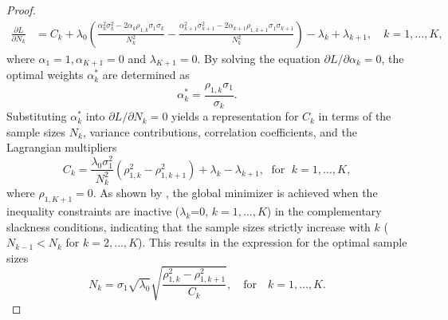 \begin{proof}
\begin{align*}
    \frac{\partial L}{\partial N_k}&=C_k+\lambda_0\left(\frac{\alpha_k^2\sigma_k^2 - 2\alpha_k\rho_{1,k}\sigma_1\sigma_k}{N_k^2}-\frac{\alpha_{k+1}^2\sigma_{k+1}^2 - 2\alpha_{k+1}\rho_{1,k+1}\sigma_1\sigma_{k+1}}{N_k^2}\right)-\lambda_k+\lambda_{k+1}, \quad k=1,\dots,K,
\end{align*}
%
where $\alpha_1 = 1, \alpha_{K+1} = 0$ and $\lambda_{K+1} = 0$. By solving the equation $\partial L/\partial \alpha_k=0$, the optimal weights $\alpha_k^*$ are determined as
%
\[
\alpha_k^*=\frac{\rho_{1,k}\sigma_1}{\sigma_k}.
\]
%
Substituting $\alpha_k^*$ into $\partial L/\partial N_k=0$ yields a representation for $C_k$ in terms of the sample sizes $N_k$, variance contributions, correlation coefficients, and the Lagrangian multipliers
\begin{equation*}
    C_k=\frac{\lambda_0\sigma_1^2}{N_k^2}\left(\rho_{1,k}^2-\rho_{1,k+1}^2\right)+\lambda_k-\lambda_{k+1}, \;\text{ for }\; k=1,\ldots,K, 
\end{equation*}
where $\rho_{1,K+1} = 0$. As shown by  \cite{PeWiGu:2016}, the global minimizer is achieved when the inequality constraints are inactive ($\lambda_k$=0, $k=1,\dots, K$) in the complementary slackness conditions, indicating that the sample sizes strictly increase with $k$ ($N_{k-1}< N_k$ for $k=2,\ldots, K$). This results in the expression for the optimal sample sizes
\begin{equation}
\label{eq:sample_size_1}
    N_k = \sigma_1\sqrt{\lambda_0}\sqrt{\frac{\rho_{1,k}^2-\rho_{1,k+1}^2}{C_k}},\quad \text{for}\quad  k=1,\ldots,K.
\end{equation}

\end{proof}
